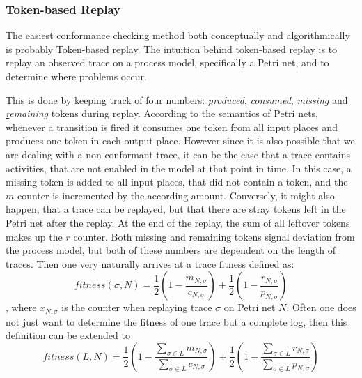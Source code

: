 \documentclass[runningheads]{template/llncs}
\begin{document}
\subsubsection{Token-based Replay}

The easiest conformance checking method both conceptually and algorithmically is probably Token-based replay.
The intuition behind token-based replay is to replay an observed trace on a process model, specifically a Petri net, and to determine where problems occur.

This is done by keeping track of four numbers: \emph{\underline{p}roduced}, \emph{\underline{c}onsumed}, \emph{\underline{m}issing} and \emph{\underline{r}emaining} tokens during replay.
According to the semantics of Petri nets, whenever a transition is fired it consumes one token from all input places and produces one token in each output place.
However since it is also possible that we are dealing with a non-conformant trace, it can be the case that a trace contains activities, that are not enabled in the model at that point in time.
In this case, a missing token is added to all input places, that did not contain a token, and the $m$ counter is incremented by the according amount.
Conversely, it might also happen, that a trace can be replayed, but that there are stray tokens left in the Petri net after the replay. 
At the end of the replay, the sum of all leftover tokens makes up the $r$ counter.
Both missing and remaining tokens signal deviation from the process model, but both of these numbers are dependent on the length of traces.
Then one very naturally arrives at a trace fitness defined as:
\begin{equation}
	fitness(\sigma,N) = \frac{1}{2}(1-\frac{m_{N,\sigma}}{c_{N,\sigma}})+\frac{1}{2}(1-\frac{r_{N,\sigma}}{p_{N,\sigma}})
\end{equation}
, where $x_{N,\sigma}$ is the counter when replaying trace $\sigma$ on Petri net $N$.
Often one does not just want to determine the fitness of one trace but a complete log, then this definition can be extended to 
\begin{equation}
	fitness(L,N) = \frac{1}{2}(1-\frac{\sum_{\sigma\in L}m_{N,\sigma}}{\sum_{\sigma\in L}c_{N,\sigma}})+\frac{1}{2}(1-\frac{\sum_{\sigma\in L}r_{N,\sigma}}{\sum_{\sigma\in L}p_{N,\sigma}})
\end{equation}
\end{document}
